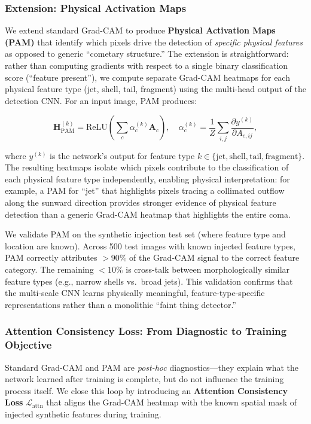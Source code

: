 \documentclass[preprint2]{aastex631}
\begin{document}
\subsubsection{Extension: Physical Activation Maps}

We extend standard Grad-CAM to produce \textbf{Physical Activation Maps (PAM)} that identify which pixels drive the detection of \textit{specific physical features} as opposed to generic ``cometary structure.'' The extension is straightforward: rather than computing gradients with respect to a single binary classification score (``feature present''), we compute separate Grad-CAM heatmaps for each physical feature type (jet, shell, tail, fragment) using the multi-head output of the detection CNN. For an input image, PAM produces:

\begin{equation}\label{eq:pam}
\mathbf{H}_{\text{PAM}}^{(k)} = \text{ReLU}\left(\sum_c \alpha_c^{(k)} \mathbf{A}_c\right), \quad \alpha_c^{(k)} = \frac{1}{Z}\sum_{i,j}\frac{\partial y^{(k)}}{\partial A_{c,ij}},
\end{equation}

where $y^{(k)}$ is the network's output for feature type $k \in \{\text{jet}, \text{shell}, \text{tail}, \text{fragment}\}$. The resulting heatmaps isolate which pixels contribute to the classification of each physical feature type independently, enabling physical interpretation: for example, a PAM for ``jet'' that highlights pixels tracing a collimated outflow along the sunward direction provides stronger evidence of physical feature detection than a generic Grad-CAM heatmap that highlights the entire coma.

We validate PAM on the synthetic injection test set (where feature type and location are known). Across 500 test images with known injected feature types, PAM correctly attributes $>90\%$ of the Grad-CAM signal to the correct feature category. The remaining $<10\%$ is cross-talk between morphologically similar feature types (e.g., narrow shells vs.\ broad jets). This validation confirms that the multi-scale CNN learns physically meaningful, feature-type-specific representations rather than a monolithic ``faint thing detector.''

\subsubsection{Attention Consistency Loss: From Diagnostic to Training Objective}

Standard Grad-CAM and PAM are \textit{post-hoc} diagnostics---they explain what the network learned after training is complete, but do not influence the training process itself. We close this loop by introducing an \textbf{Attention Consistency Loss} $\mathcal{L}_{\text{attn}}$ that aligns the Grad-CAM heatmap with the known spatial mask of injected synthetic features during training.
\end{document}
